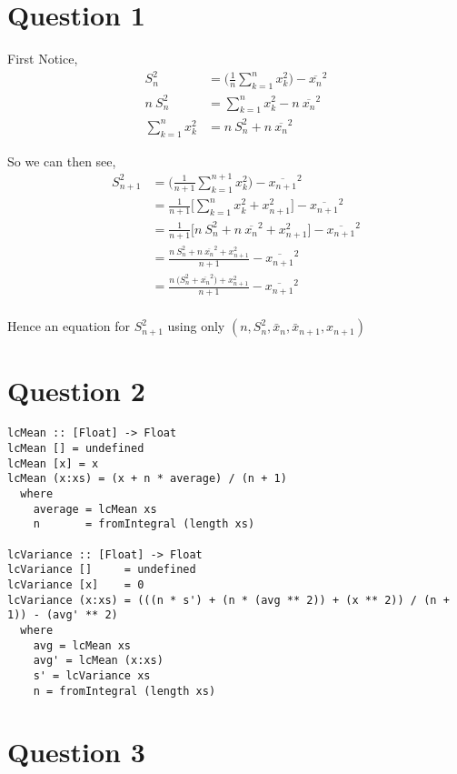 \documentclass{article}
\begin{document}
\section{Question 1}

First Notice, 
$$\begin{aligned}
S_n^2 & = \Big( \frac{1}{n} \sum_{k=1}^n{x^2_k}\Big) - \overline{x_n}^2\\
    n\ S_n^2 & = \sum_{k=1}^n{x_k^2} - n\ \overline{x_n}^2\\
    \sum_{k=1}^n{x_k^2} & = n\ S_n^2 + n\ \overline{x_n}^2
\end{aligned}$$

So we can then see,
$$\begin{aligned}
S_{n+1}^2 & = \Big( \frac{1}{n + 1} \sum_{k=1}^{n+1}{x_k^2} \Big) - \overline{x_{n+1}}^2\\
    & = \frac{1}{n + 1} \Big[ \sum_{k=1}^n{x_k^2} + x_{n+1}^2\Big] - \overline{x_{n+1}}^2\\
    & = \frac{1}{n + 1} \Big[ n\ S_n^2 + n\ \overline{x_n}^2 + x_{n+1}^2\Big] - \overline{x_{n+1}}^2\\
    & = \frac{n\ S_n^2 + n\ \overline{x_n}^2 + x_{n+1}^2}{n + 1} - \overline{x_{n+1}}^2\\
    & = \frac{n\ \Big(S_n^2 + \overline{x_n}^2\Big) + x_{n+1}^2}{n + 1} - \overline{x_{n+1}}^2\\
\end{aligned}$$

Hence an equation for $S_{n+1}^2$ using only $(n, S^2_n,  \bar{x}_n, \bar{x}_{n+1}, x_{n+1})$

\clearpage

\section{Question 2}

\begin{verbatim}
lcMean :: [Float] -> Float
lcMean [] = undefined
lcMean [x] = x
lcMean (x:xs) = (x + n * average) / (n + 1)
  where
    average = lcMean xs
    n       = fromIntegral (length xs)

lcVariance :: [Float] -> Float
lcVariance []     = undefined
lcVariance [x]    = 0
lcVariance (x:xs) = (((n * s') + (n * (avg ** 2)) + (x ** 2)) / (n + 1)) - (avg' ** 2)
  where
    avg = lcMean xs
    avg' = lcMean (x:xs)
    s' = lcVariance xs
    n = fromIntegral (length xs)
\end{verbatim}

\section{Question 3}
\end{document}
